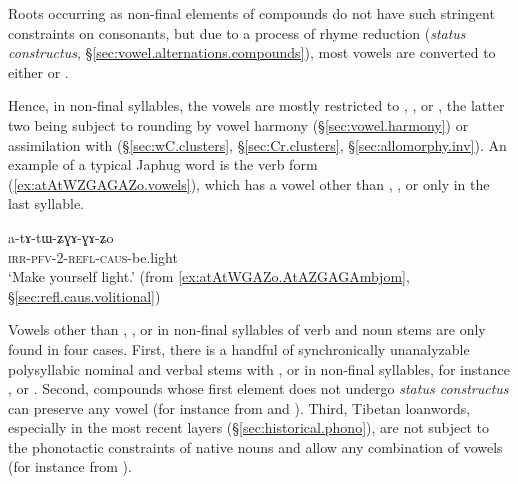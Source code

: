 Roots occurring as non-final elements of compounds do not have such stringent constraints on consonants, but due to a process of rhyme reduction (\textit{status constructus}, §\ref{sec:vowel.alternations.compounds}), most vowels are converted to either  or .

Hence, in non-final syllables, the vowels are mostly restricted to , , or , the latter two being subject to rounding by vowel harmony (§\ref{sec:vowel.harmony}) or assimilation with  (§\ref{sec:wC.clusters}, §\ref{sec:Cr.clusters}, §\ref{sec:allomorphy.inv}). An example of a typical Japhug word is the verb form  (\ref{ex:atAtWZGAGAZo.vowels}), which has a vowel other than , , or  only in the last syllable.

\begin{exe}
	\ex \label{ex:atAtWZGAGAZo.vowels}
	\gll a-tɤ-tɯ-ʑɣɤ-ɣɤ-ʑo \\
	\textsc{irr}-\textsc{pfv}-2-\textsc{refl}-\textsc{caus}-be.light \\
	\glt `Make yourself light.' (from \ref{ex:atAtWGAZo.AtAZGAGAmbjom}, §\ref{sec:refl.caus.volitional})
\end{exe}


Vowels other than , , or  in non-final syllables of verb and noun stems are only found in four cases. First, there is a handful of synchronically unanalyzable polysyllabic nominal and verbal stems with ,  or  in non-final syllables, for instance ,  or . Second, compounds whose first element does not undergo \textit{status constructus} can preserve any vowel (for instance  from  and ). Third,  Tibetan loanwords, especially in the most recent layers (§\ref{sec:historical.phono}), are not subject to the phonotactic constraints of native nouns and allow any combination of vowels (for instance  from ).

